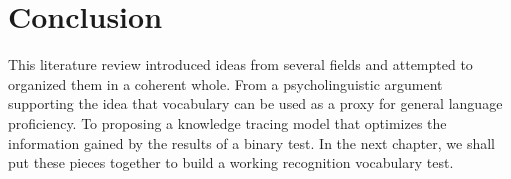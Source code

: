\section{Conclusion}
This literature review introduced ideas from several fields and attempted to organized them in a coherent whole. From a psycholinguistic argument supporting the idea that vocabulary can be used as a proxy for general language proficiency. To proposing a knowledge tracing model that optimizes the information gained by the results of a binary test. In the next chapter, we shall put these pieces together to build a working recognition vocabulary test.
